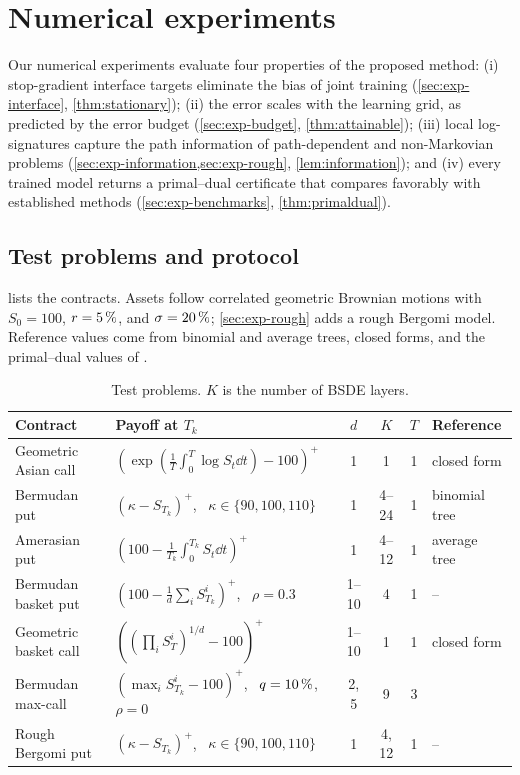\section{Numerical experiments}\label{sec:experiments}

Our numerical experiments evaluate four properties of the proposed method: (i) stop-gradient interface targets eliminate the bias of joint training (\cref{sec:exp-interface}, \cref{thm:stationary}); (ii) the error scales with the learning grid, as predicted by the error budget (\cref{sec:exp-budget}, \cref{thm:attainable}); (iii) local log-signatures capture the path information of path-dependent and non-Markovian problems (\cref{sec:exp-information,sec:exp-rough}, \cref{lem:information}); and (iv) every trained model returns a primal--dual certificate that compares favorably with established methods (\cref{sec:exp-benchmarks}, \cref{thm:primaldual}).

\subsection{Test problems and protocol}\label{sec:exp-setup}

 lists the contracts. Assets follow correlated geometric Brownian motions with $S_0=100$, $r=5\,\%$, and $\sigma=20\,\%$; \cref{sec:exp-rough} adds a rough Bergomi model. Reference values come from binomial and average trees, closed forms, and the primal--dual values of \cite{andersen2004}.

\begin{table}[htbp]
\centering\footnotesize
\caption{Test problems. $K$ is the number of BSDE layers.}
\label{tab:problems}
\setlength{\tabcolsep}{4pt}
\begin{tabular}{@{}l l c c c l@{}}
\toprule
Contract & Payoff at $T_k$ & $d$ & $K$ & $T$ & Reference\\
\midrule
Geometric Asian call & $\left(\exp(\tfrac1T\!\int_0^T\log S_t\dd t)-100\right)^+$ & 1 & 1 & 1 & closed form\\
Bermudan put & $(\kappa-S_{T_k})^+$, \ $\kappa\in\{90,100,110\}$ & 1 & 4--24 & 1 & binomial tree\\
Amerasian put & $\left(100-\tfrac1{T_k}\!\int_0^{T_k}S_t\dd t\right)^+$ & 1 & 4--12 & 1 & average tree\\
Bermudan basket put & $(100-\tfrac1d\sum_iS^i_{T_k})^+$, \ $\rho=0.3$ & 1--10 & 4 & 1 & --\\
Geometric basket call & $\left((\prod_iS^i_T)^{1/d}-100\right)^+$ & 1--10 & 1 & 1 & closed form\\
Bermudan max-call & $(\max_iS^i_{T_k}-100)^+$, \ $q=10\,\%$, $\rho=0$ & 2, 5 & 9 & 3 & \cite{andersen2004}\\
Rough Bergomi put & $(\kappa-S_{T_k})^+$, \ $\kappa\in\{90,100,110\}$ & 1 & 4, 12 & 1 & --\\
\bottomrule
\end{tabular}
\end{table}

